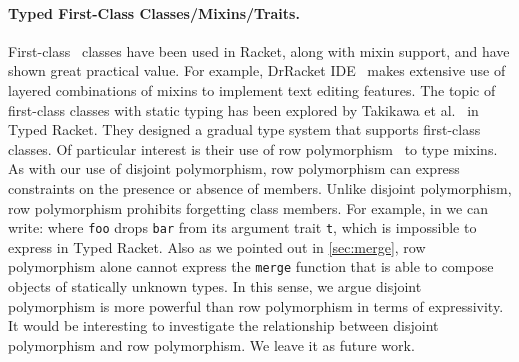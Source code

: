 
\paragraph{Typed First-Class Classes/Mixins/Traits.}
First-class~\citep{DBLP:conf/aplas/FlattFF06} classes have been used in
Racket, along with mixin support, and
have shown great practical value. For example, DrRacket
IDE~\citep{DBLP:journals/jfp/FindlerCFFKSF02} makes extensive use of layered
combinations of mixins to implement text editing features. The topic of
first-class classes with static typing has been explored by Takikawa et
al.~\citep{DBLP:conf/oopsla/TakikawaSDTF12} in Typed Racket. They designed a
gradual type system that supports first-class classes. Of particular interest is
their use of row polymorphism~\citep{wand1994type} to type mixins.
As with our use of disjoint polymorphism, row polymorphism can express
constraints on the presence or absence of members. Unlike disjoint polymorphism,
row polymorphism prohibits forgetting class members.
For example, in \name we can write:
where \lstinline{foo} drops \lstinline{bar} from its argument trait \lstinline{t},
which is impossible to express in Typed Racket. Also as we pointed out in \cref{sec:merge}, row polymorphism
alone cannot express the \lstinline{merge} function that is able to compose objects of statically unknown types.
In this sense, we argue disjoint polymorphism is more powerful than row polymorphism in terms of expressivity.
It would be interesting to investigate the relationship between disjoint polymorphism and row polymorphism. We leave it
as future work.



